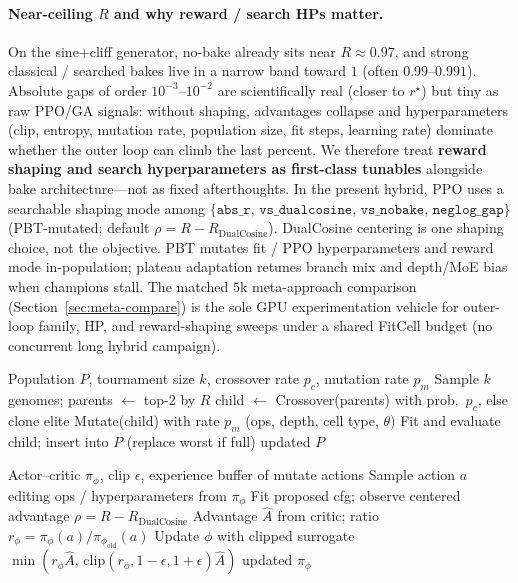 \paragraph{Near-ceiling $R$ and why reward / search HPs matter.}
\label{sec:reward-shaping}
On the sine{+}cliff generator, no-bake already sits near $R\approx 0.97$, and strong classical / searched bakes live in a narrow band toward $1$ (often $0.99$--$0.991$).
Absolute gaps of order $10^{-3}$--$10^{-2}$ are scientifically real (closer to $r^{\star}$) but tiny as raw PPO/GA signals: without shaping, advantages collapse and hyperparameters (clip, entropy, mutation rate, population size, fit steps, learning rate) dominate whether the outer loop can climb the last percent.
We therefore treat \textbf{reward shaping and search hyperparameters as first-class tunables} alongside bake architecture---not as fixed afterthoughts.
In the present hybrid, PPO uses a searchable shaping mode among $\{\texttt{abs\_r},\,\texttt{vs\_dualcosine},\,\texttt{vs\_nobake},\,\texttt{neglog\_gap}\}$ (PBT-mutated; default $\rho = R - R_{\mathrm{DualCosine}}$).
DualCosine centering is one shaping choice, not the objective.
PBT mutates fit / PPO hyperparameters and reward mode in-population; plateau adaptation retunes branch mix and depth/MoE bias when champions stall.
The matched $5$k meta-approach comparison (Section~\ref{sec:meta-compare}) is the sole GPU experimentation vehicle for outer-loop family, HP, and reward-shaping sweeps under a shared FitCell budget (no concurrent long hybrid campaign).

\begin{algorithm}[t]
\caption{GA tournament step}
\label{alg:ga}
\begin{algorithmic}[1]
\Require Population $P$, tournament size $k$, crossover rate $p_c$, mutation rate $p_m$
\State Sample $k$ genomes; parents $\gets$ top-2 by $R$
\State child $\gets$ Crossover(parents) with prob.\ $p_c$, else clone elite
\State Mutate(child) with rate $p_m$ (ops, depth, cell type, $\theta$)
\State Fit and evaluate child; insert into $P$ (replace worst if full)
\State \Return updated $P$
\end{algorithmic}
\end{algorithm}

\begin{algorithm}[t]
\caption{PPO architecture update}
\label{alg:ppo}
\begin{algorithmic}[1]
\Require Actor--critic $\pi_\phi$, clip $\epsilon$, experience buffer of mutate actions
\State Sample action $a$ editing ops / hyperparameters from $\pi_\phi$
\State Fit proposed cfg; observe centered advantage $\rho = R - R_{\mathrm{DualCosine}}$ 
\State Advantage $\hat{A}$ from critic; ratio $r_\phi = \pi_\phi(a)/\pi_{\phi_{\mathrm{old}}}(a)$
\State Update $\phi$ with clipped surrogate $\min(r_\phi\hat{A},\,\mathrm{clip}(r_\phi,1-\epsilon,1+\epsilon)\hat{A})$
\State \Return updated $\pi_\phi$
\end{algorithmic}
\end{algorithm}

